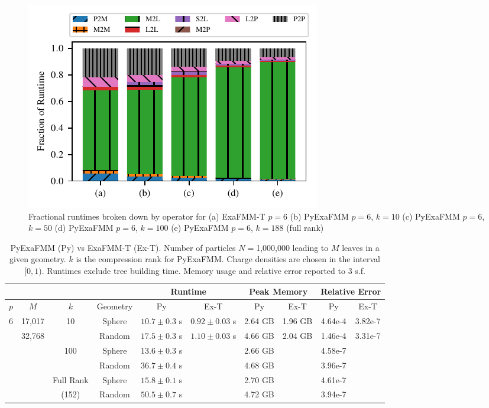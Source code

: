 \documentclass{IEEEcsmag}
\begin{document}
\begin{figure}
	\centerline{\includegraphics {figures/operator_runtimes.pdf}}
	\caption{Fractional runtimes broken down by operator for (a) ExaFMM-T $p=6$ (b) PyExaFMM $p=6$, $k=10$ (c) PyExaFMM $p=6$, $k=50$ (d) PyExaFMM $p=6$, $k=100$ (e) PyExaFMM $p=6$, $k=188$ (full rank)}
	\label{fig:operator_runtimes}
\end{figure}

\begin{table}
	\centering
	\caption{PyExaFMM (Py) vs ExaFMM-T (Ex-T). Number of particles $N=$1,000,000 leading to $M$ leaves in a given geometry. $k$ is the compression rank for PyExaFMM. Charge densities are chosen in the interval $[0, 1)$. Runtimes exclude tree building time. Memory usage and relative error reported to 3 s.f.}
	\begin{tabular*}{0.934\textwidth}{|*{10}{c|}}
		\hline
		& & &   & \multicolumn{2}{c|}{Runtime} & \multicolumn{2}{c|}{Peak Memory} & \multicolumn{2}{c|}{Relative Error}\\
		\hline
		$p$ & $M$ &$k$ &  Geometry   &   Py  &  Ex-T &    Py  &  Ex-T  &   Py  &  Ex-T\\
		\hline
		6 & 17,017 & 10 &   Sphere  &  $10.7 \pm 0.3$ s & $0.92 \pm 0.03$ s  &  2.64 GB  &  1.96 GB  & 4.64e-4 & 3.82e-7 \\
		 & 32,768 &    &   Random  &  $17.5 \pm 0.3$ s &  $1.10 \pm 0.03$ s &  4.66 GB  &  2.04 GB  & 1.46e-4 &  3.31e-7\\
		 & & 100   &   Sphere  &  $13.6 \pm 0.3$ s &   &  2.66 GB  &   & 4.58e-7 &  \\
		 & &    &   Random  &  $36.7 \pm 0.4$ s &  &  4.68 GB  &  & 3.96e-7 & \\
		 & & Full Rank  &   Sphere  &  $15.8 \pm 0.1$ s &   &  2.70 GB  &  & 4.61e-7 & \\
		 & & (152) &   Random  &  $50.5 \pm 0.7$ s &   &  4.72 GB  &  & 3.94e-7 & \\
		\hline
	\end{tabular*}
	\label{tab:performance}
 \end{table}
\end{document}

